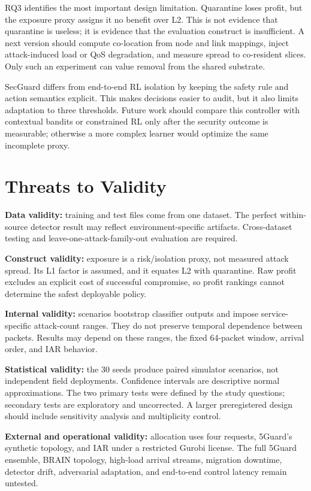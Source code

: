 \documentclass[conference]{IEEEtran}
\begin{document}
RQ3 identifies the most important design limitation. Quarantine loses profit,
but the exposure proxy assigns it no benefit over L2. This is not evidence that
quarantine is useless; it is evidence that the evaluation construct is
insufficient. A next version should compute co-location from node and link
mappings, inject attack-induced load or QoS degradation, and measure spread to
co-resident slices. Only such an experiment can value removal from the shared
substrate.

SecGuard differs from end-to-end RL isolation \cite{javadpour2023isolation} by
keeping the safety rule and action semantics explicit. This makes decisions
easier to audit, but it also limits adaptation to three thresholds. Future work
should compare this controller with contextual bandits or constrained RL only
after the security outcome is measurable; otherwise a more complex learner
would optimize the same incomplete proxy.

\section{Threats to Validity}
\textbf{Data validity:} training and test files come from one dataset. The
perfect within-source detector result may reflect environment-specific
artifacts. Cross-dataset testing and leave-one-attack-family-out evaluation are
required.

\textbf{Construct validity:} exposure is a risk/isolation proxy, not measured
attack spread. Its L1 factor is assumed, and it equates L2 with quarantine. Raw
profit excludes an explicit cost of successful compromise, so profit rankings
cannot determine the safest deployable policy.

\textbf{Internal validity:} scenarios bootstrap classifier outputs and impose
service-specific attack-count ranges. They do not preserve temporal dependence
between packets. Results may depend on these ranges, the fixed 64-packet window,
arrival order, and IAR behavior.

\textbf{Statistical validity:} the 30 seeds produce paired simulator scenarios,
not independent field deployments. Confidence intervals are descriptive normal
approximations. The two primary tests were defined by the study questions;
secondary tests are exploratory and uncorrected. A larger preregistered design
should include sensitivity analysis and multiplicity control.

\textbf{External and operational validity:} allocation uses four requests,
5Guard's synthetic topology, and IAR under a restricted Gurobi license. The full
5Guard ensemble, BRAIN topology, high-load arrival streams, migration downtime,
detector drift, adversarial adaptation, and end-to-end control latency remain
untested.
\end{document}
